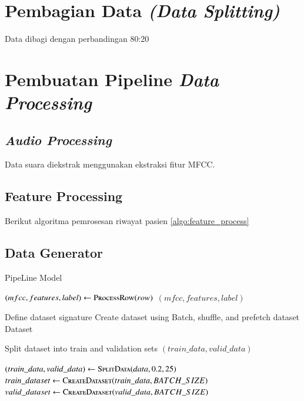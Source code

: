 \section{Pembagian Data \textit{(Data Splitting)}}
Data dibagi dengan perbandingan 80:20

\section{Pembuatan Pipeline \textit{Data Processing}}

\subsection{\textit{Audio Processing}}
Data suara diekstrak menggunakan ekstraksi fitur MFCC.

\subsection{Feature Processing}
Berikut algoritma pemrosesan riwayat pasien \ref{algo:feature_process}


\subsection{Data Generator}
\begin{algorithm}[H]
\caption{PipeLine Model}
\begin{algorithmic}[1]

        \State $(mfcc, features, label) \gets \Call{ProcessRow}{row}$
        \State \Yield $(mfcc, features, label)$
    \EndFor
\EndFunction

    \State Define dataset signature
    \State Create dataset using 
    \State Batch, shuffle, and prefetch dataset
    \State \Return Dataset
\EndFunction

    \State Split dataset into train and validation sets
    \State \Return $(train\_data, valid\_data)$
\EndFunction

\State $(train\_data, valid\_data) \gets \Call{SplitData}{data, 0.2, 25}$
\State $train\_dataset \gets \Call{CreateDataset}{train\_data, BATCH\_SIZE}$
\State $valid\_dataset \gets \Call{CreateDataset}{valid\_data, BATCH\_SIZE}$

\end{algorithmic}
\end{algorithm}

